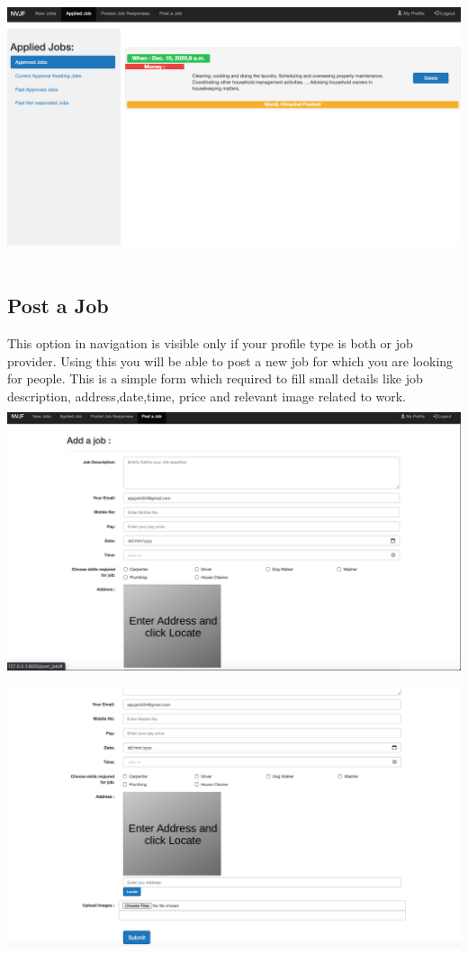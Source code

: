 \documentclass[a4paper 12pt]{article}
\begin{document}
\includegraphics[width=15cm, height=8cm]{applied job approved.png}


\subsection{Post a Job}
This option in navigation is visible only if your profile type is both or job provider. Using this you will be able to post a new job for which you are looking for people. This is a simple form which required to fill small details like job description, address,date,time, price and relevant image related to work. \\

\includegraphics[width=15cm, height=8cm]{post job 2.png}
\includegraphics[width=15cm, height=8cm]{post job 1.png}
\end{document}
